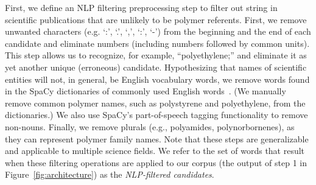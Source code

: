 First, we define an
NLP filtering preprocessing step to filter out
string
 in scientific publications that are unlikely to be polymer referents. 
First, we remove
unwanted characters (e.g. `:', `.', `,', `:', `-') from the beginning and the end of each
candidate and eliminate numbers (including numbers followed by common units).
This step allows us to recognize, for example, ``polyethylene;'' and eliminate it as yet another unique (erroneous) candidate. 
Hypothesizing that names of scientific entities will not, in general, be English
vocabulary words, we remove words found in the SpaCy dictionaries
of commonly used English words~\cite{choi2015depends}. (We manually remove common polymer
names, such as polystyrene and polyethylene, from the dictionaries.) 
We also use
SpaCy's part-of-speech tagging functionality to remove non-nouns.  
Finally, we remove plurals (e.g.,
polyamides, polynorbornenes), as they can represent polymer family names.
Note that these steps are generalizable and applicable to multiple science fields.
We refer to the set of words that result when these filtering operations are applied to our corpus (the output of step 1 in Figure~\ref{fig:architecture}) as the \emph{NLP-filtered candidates}.


